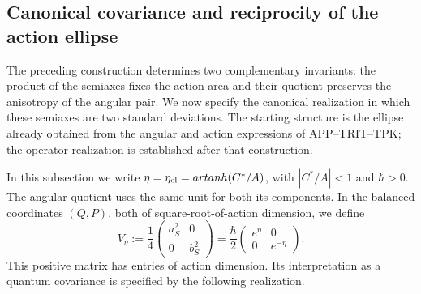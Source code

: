 
\subsection{Canonical covariance and reciprocity of the action ellipse}
\label{ii:sec:ii-area-covarianza}

The preceding construction determines two complementary invariants: the product of the semiaxes fixes the action area and their quotient preserves the anisotropy of the angular pair. We now specify the canonical realization in which these semiaxes are two standard deviations. The starting structure is the ellipse already obtained from the angular and action expressions of APP--TRIT--TPK; the operator realization is established after that construction.

In this subsection we write \(\eta=\eta_{\rm el}
=\operatorname{artanh}(C^*/A)\), with \(|C^*/A|<1\) and \(\hbar>0\). The angular quotient uses the same unit for both its components. In the balanced coordinates \((Q,P)\), both of square-root-of-action dimension, we define
\begin{equation}
 V_\eta:=\frac14
 \begin{pmatrix}a_S^2&0\\0&b_S^2\end{pmatrix}
 =\frac{\hbar}{2}
 \begin{pmatrix}e^\eta&0\\0&e^{-\eta}\end{pmatrix}.
 \label{ii:eq:ii-covarianza-geometrica}
\end{equation}
This positive matrix has entries of action dimension. Its interpretation as a quantum covariance is specified by the following realization.

